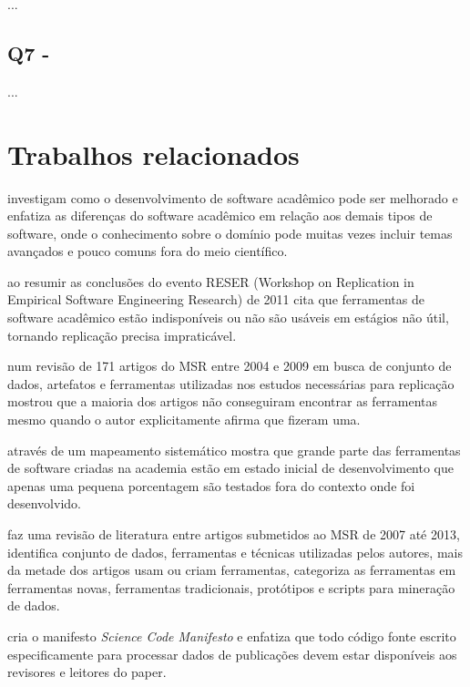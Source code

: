 ...

\subsection{Q7 - \QuestaoSete} %

...

\section{Trabalhos relacionados}

investigam como o desenvolvimento de software acadêmico pode ser melhorado e
enfatiza as diferenças do software acadêmico em relação aos demais tipos de
software, onde o conhecimento sobre o domínio pode muitas vezes incluir temas
avançados e pouco comuns fora do meio científico.

ao resumir as conclusões do evento RESER (Workshop on Replication in Empirical
Software Engineering Research) de 2011 cita que ferramentas de software
acadêmico estão indisponíveis ou não são usáveis em estágios não útil, tornando
replicação precisa impraticável.

 num revisão de 171 artigos do MSR entre 2004 e 2009
em busca de conjunto de dados, artefatos e ferramentas utilizadas nos estudos
necessárias para replicação mostrou que a maioria dos artigos não conseguiram encontrar
as ferramentas mesmo quando o autor explicitamente afirma que fizeram uma.


através de um mapeamento sistemático mostra que grande parte das ferramentas de
software criadas na academia estão em estado inicial de desenvolvimento que
apenas uma pequena porcentagem são testados fora do contexto onde foi
desenvolvido. 

faz uma revisão de literatura entre artigos submetidos ao MSR de 2007 até 2013,
identifica conjunto de dados, ferramentas e técnicas utilizadas pelos autores,
mais da metade dos artigos usam ou criam ferramentas, categoriza as ferramentas
em ferramentas novas, ferramentas tradicionais, protótipos e scripts para
mineração de dados.

cria o manifesto {\it Science Code Manifesto} e enfatiza que todo código fonte
escrito especificamente para processar dados de publicações devem estar
disponíveis aos revisores e leitores do paper.

